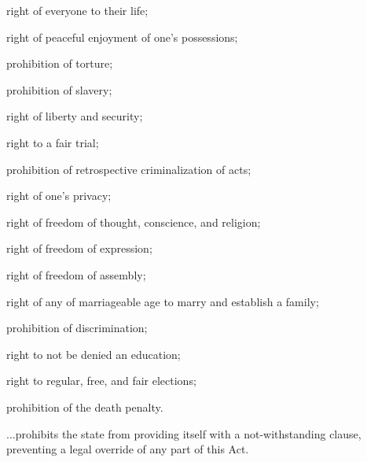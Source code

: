     \startitemize[R,2*broad][start=11]
    \setupitemize[left=(, right=)]
    \item right of everyone to their life;
    \item right of peaceful enjoyment of one's possessions;
    \item prohibition of torture;
    \item prohibition of slavery;
    \item right of liberty and security;
    \item right to a fair trial;
    \item prohibition of retrospective criminalization of acts;
    \item right of one's privacy;
    \item right of freedom of thought, conscience, and religion;
    \item right of freedom of expression;
    \item right of freedom of assembly;
    \item right of any of marriageable age to marry and establish a family;
    \item prohibition of discrimination;
    \item right to not be denied an education;
    \item right to regular, free, and fair elections;
    \item prohibition of the death penalty.
    \stopitemize

\stopitemize

\startitemize[R][start=29]
\setupitemize[left=Article\space, right=, stopper=]
\item %

...prohibits the state from providing itself with a not-withstanding clause, preventing a legal override of any part of this Act.
\stopitemize

